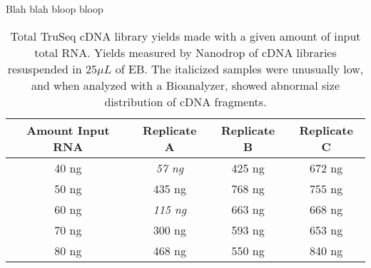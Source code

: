 Blah blah bloop bloop


\begin{table}[htdp]
\caption{Total TruSeq cDNA library yields made with a given amount of input total RNA.  Yields measured by Nanodrop of cDNA libraries resuspended in 25$\mu L$ of EB. The italicized samples were unusually low, and when analyzed with a Bioanalyzer, showed abnormal size distribution of cDNA fragments.}
\begin{center}
\begin{tabular}{|c|c|c|c|}\hline
Amount Input RNA & Replicate A & Replicate B & Replicate C\\\hline
40 ng & {\em  57 ng}  & 425 ng & 672 ng\\
50 ng & 435 ng & 768 ng & 755 ng\\
60 ng & {\em 115 ng} & 663 ng & 668 ng\\
70 ng & 300 ng & 593 ng & 653 ng\\
80 ng & 468 ng & 550 ng & 840 ng\\\hline
\end{tabular}
\end{center}
\label{table:removeme}
\end{table}


